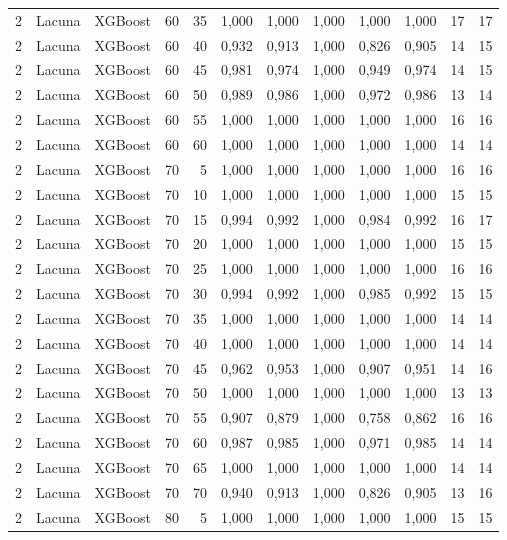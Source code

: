 \begin{longtable}{@{}rllrrrrrrrrr@{}}
2 & Lacuna & XGBoost & 60 & 35 & 1,000 & 1,000 & 1,000 & 1,000 & 1,000 & 17 & 17 \\
2 & Lacuna & XGBoost & 60 & 40 & 0,932 & 0,913 & 1,000 & 0,826 & 0,905 & 14 & 15 \\
2 & Lacuna & XGBoost & 60 & 45 & 0,981 & 0,974 & 1,000 & 0,949 & 0,974 & 14 & 15 \\
2 & Lacuna & XGBoost & 60 & 50 & 0,989 & 0,986 & 1,000 & 0,972 & 0,986 & 13 & 14 \\
2 & Lacuna & XGBoost & 60 & 55 & 1,000 & 1,000 & 1,000 & 1,000 & 1,000 & 16 & 16 \\
2 & Lacuna & XGBoost & 60 & 60 & 1,000 & 1,000 & 1,000 & 1,000 & 1,000 & 14 & 14 \\
2 & Lacuna & XGBoost & 70 & 5 & 1,000 & 1,000 & 1,000 & 1,000 & 1,000 & 16 & 16 \\
2 & Lacuna & XGBoost & 70 & 10 & 1,000 & 1,000 & 1,000 & 1,000 & 1,000 & 15 & 15 \\
2 & Lacuna & XGBoost & 70 & 15 & 0,994 & 0,992 & 1,000 & 0,984 & 0,992 & 16 & 17 \\
2 & Lacuna & XGBoost & 70 & 20 & 1,000 & 1,000 & 1,000 & 1,000 & 1,000 & 15 & 15 \\
2 & Lacuna & XGBoost & 70 & 25 & 1,000 & 1,000 & 1,000 & 1,000 & 1,000 & 16 & 16 \\
2 & Lacuna & XGBoost & 70 & 30 & 0,994 & 0,992 & 1,000 & 0,985 & 0,992 & 15 & 15 \\
2 & Lacuna & XGBoost & 70 & 35 & 1,000 & 1,000 & 1,000 & 1,000 & 1,000 & 14 & 14 \\
2 & Lacuna & XGBoost & 70 & 40 & 1,000 & 1,000 & 1,000 & 1,000 & 1,000 & 14 & 14 \\
2 & Lacuna & XGBoost & 70 & 45 & 0,962 & 0,953 & 1,000 & 0,907 & 0,951 & 14 & 16 \\
2 & Lacuna & XGBoost & 70 & 50 & 1,000 & 1,000 & 1,000 & 1,000 & 1,000 & 13 & 13 \\
2 & Lacuna & XGBoost & 70 & 55 & 0,907 & 0,879 & 1,000 & 0,758 & 0,862 & 16 & 16 \\
2 & Lacuna & XGBoost & 70 & 60 & 0,987 & 0,985 & 1,000 & 0,971 & 0,985 & 14 & 14 \\
2 & Lacuna & XGBoost & 70 & 65 & 1,000 & 1,000 & 1,000 & 1,000 & 1,000 & 14 & 14 \\
2 & Lacuna & XGBoost & 70 & 70 & 0,940 & 0,913 & 1,000 & 0,826 & 0,905 & 13 & 16 \\
2 & Lacuna & XGBoost & 80 & 5 & 1,000 & 1,000 & 1,000 & 1,000 & 1,000 & 15 & 15 \\

\end{longtable}
